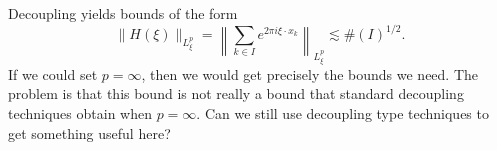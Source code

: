 \documentclass[dvipsnames,letterpaper,12pt]{article}
\numberwithin{equation}{section}
\numberwithin{theorem}{section}
\begin{document}
Decoupling yields bounds of the form
%
\[ \| H(\xi) \|_{L^p_\xi} = \left\| \sum_{k \in I} e^{2 \pi i \xi \cdot x_k} \right\|_{L^p_\xi} \lesssim \#(I)^{1/2}. \]
%
If we could set $p = \infty$, then we would get precisely the bounds we need. The problem is that this bound is not really a bound that standard decoupling techniques obtain when $p = \infty$. Can we still use decoupling type techniques to get something useful here?















\end{document}
